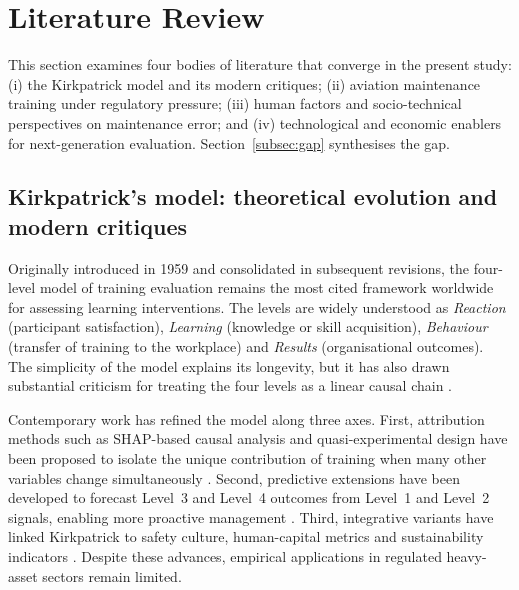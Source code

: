 \section{Literature Review}
\label{sec:literature}

This section examines four bodies of literature that converge in the present
study: (i) the Kirkpatrick model and its modern critiques; (ii) aviation
maintenance training under regulatory pressure; (iii) human factors and
socio-technical perspectives on maintenance error; and (iv) technological and
economic enablers for next-generation evaluation. Section~\ref{subsec:gap}
synthesises the gap.

\subsection{Kirkpatrick's model: theoretical evolution and modern critiques}
\label{subsec:kirkpatrick}

Originally introduced in 1959 and consolidated in subsequent revisions, the
four-level model of training evaluation \citep{Kirkpatrick2010} remains the
most cited framework worldwide for assessing learning interventions. The
levels are widely understood as
\textit{Reaction} (participant satisfaction), \textit{Learning} (knowledge or
skill acquisition), \textit{Behaviour} (transfer of training to the workplace)
and \textit{Results} (organisational outcomes). The simplicity of the model
explains its longevity, but it has also drawn substantial criticism for
treating the four levels as a linear causal chain
\citep{Patel2023,Fernandez2024}.

Contemporary work has refined the model along three axes. First, attribution
methods such as SHAP-based causal analysis and quasi-experimental design have
been proposed to isolate the unique contribution of training when many other
variables change simultaneously \citep{Fernandez2024}. Second, predictive
extensions have been developed to forecast Level~3 and Level~4 outcomes from
Level~1 and Level~2 signals, enabling more proactive management
\citep{Peterson2025}. Third, integrative variants have linked Kirkpatrick to
safety culture, human-capital metrics and sustainability indicators
\citep{Sousa2025,Yang2024}. Despite these advances, empirical applications in
regulated heavy-asset sectors remain limited.

